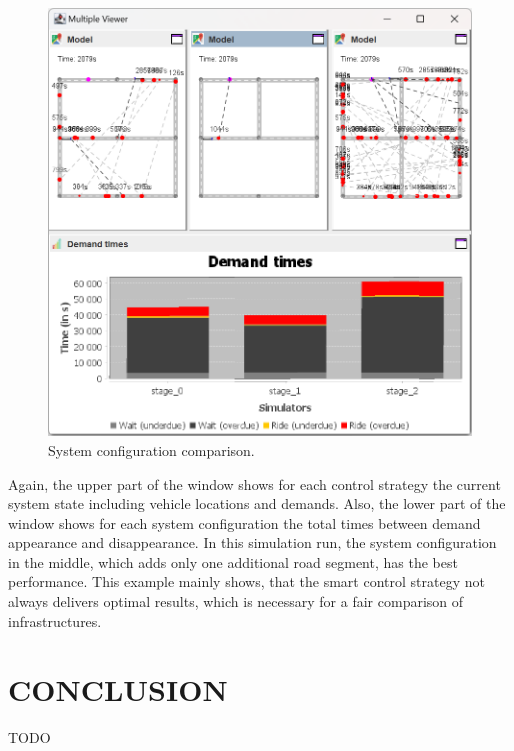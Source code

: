 \documentclass[a4paper,twoside]{article}
\begin{document}
	\begin{figure}[!ht]
		\includegraphics[width=\columnwidth]{infrastructure_comparison.png}
		\caption{System configuration comparison.}
		\label{fig:infratructure-comparison}
	\end{figure}
	
	Again, the upper part of the window shows for each control strategy the current system state including vehicle locations and demands.
	Also, the lower part of the window shows for each system configuration the total times between demand appearance and disappearance.
	In this simulation run, the system configuration in the middle, which adds only one additional road segment, has the best performance.
	This example mainly shows, that the smart control strategy not always delivers optimal results, which is necessary for a fair comparison of infrastructures.
	
	\section{\uppercase{Conclusion}}
	\label{sec:conclusion}
	
	TODO
	
	
	
	{\small
		}
	
	
\end{document}
